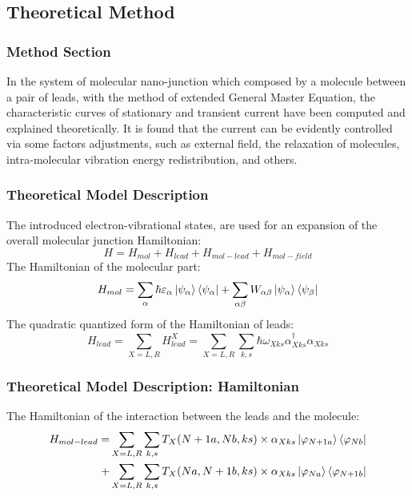 \documentclass{beamer}
\begin{document}
    \subsection{Theoretical Method}

\begin{frame}
\frametitle{Method Section}
In the system of molecular nano-junction which composed by a molecule between a pair of leads, with the method of extended General Master Equation, the characteristic curves of stationary and transient current have been computed and explained theoretically. It is found that the current can be evidently controlled via some factors adjustments, such as external field, the relaxation of molecules, intra-molecular vibration energy redistribution, and others.
\end{frame}

\begin{frame}
\frametitle{Theoretical Model Description}
    The introduced electron-vibrational states, are used for an expansion of the overall molecular junction Hamiltonian:
\begin{equation}
    H = H_{mol} + H_{lead} + H_{mol-lead} + H_{mol-field}
\end{equation}
    The Hamiltonian of the molecular part:
\begin{equation}
    H_{mol} = \sum_{\alpha}\hbar\varepsilon_{\alpha}\ket{\psi_\alpha}\bra{\psi_\alpha}+\sum_{\alpha\beta}W_{\alpha\beta}\ket{\psi_\alpha}\bra{\psi_\beta}
\end{equation}
The quadratic quantized form of the Hamiltonian of leads:
\begin{equation}
    H_{lead} = \sum_{X=L,R}H_{lead}^X = \sum_{X=L,R}\sum_{k,s}\hbar\omega_{Xks}\alpha^\dagger_{Xks}\alpha_{Xks}
\end{equation}

\end{frame}

\begin{frame}
\frametitle{Theoretical Model Description: Hamiltonian}
The Hamiltonian of the interaction between the leads and the molecule:
\begin{equation}
\begin{split}
    H_{mol-lead}= & \sum_{X=L,R}\sum_{k,s}T_X(N+1a,Nb,ks)\times\alpha_{Xks}\ket{\varphi_{N+1a}}\bra{\varphi_{Nb}}  \\
    + & \sum_{X=L,R}\sum_{k,s}T_X(Na,N+1b,ks)\times\alpha_{Xks}\ket{\varphi_{Na}}\bra{\varphi_{N+1b}} 
\end{split}
\end{equation}
\end{frame}
\end{document}

